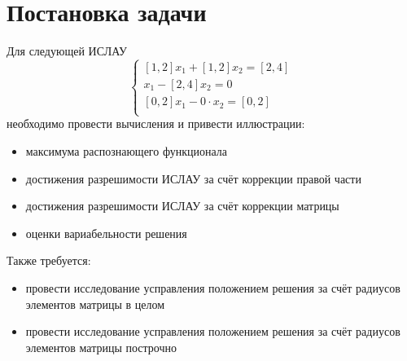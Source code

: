 \section{Постановка задачи}
Для следующей ИСЛАУ
\begin{equation*}
 \begin{cases}
   [1,2]x_1+[1,2]x_2 = [2, 4]\\
   x_1-[2, 4]x_2 = 0\\
   [0,2]x_1-0\cdot x_2 = [0,2]\\
 \end{cases}
\end{equation*}
необходимо провести вычисления и привести иллюстрации:
\begin{itemize}
    \item максимума распознающего функционала
    \item достижения разрешимости ИСЛАУ за счёт коррекции правой части
    \item достижения разрешимости ИСЛАУ за счёт коррекции матрицы
    \item оценки вариабельности решения
\end{itemize}
Также требуется:
\begin{itemize}
    \item провести исследование усправления положением решения за счёт радиусов элементов матрицы в целом 
    \item провести исследование усправления положением решения за счёт радиусов элементов матрицы построчно
\end{itemize}
